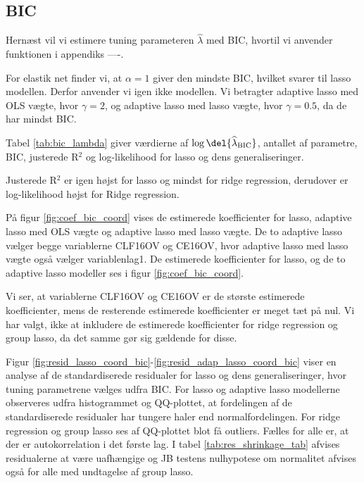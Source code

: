 \subsection{BIC}
Hernæst vil vi estimere tuning parameteren \(\widehat{\lambda}\) med BIC, hvortil vi anvender funktionen i appendiks ----.

For elastik net finder vi, at $\alpha = 1$ giver den mindste BIC, hvilket svarer til lasso modellen. Derfor anvender vi igen ikke modellen. 
Vi betragter adaptive lasso med OLS vægte, hvor $\gamma = 2$, og adaptive lasso med lasso vægte, hvor $\gamma = 0.5$, da de har mindst BIC. 

Tabel \ref{tab:bic_lambda} giver værdierne af $\log \del{ \widehat{\lambda}_\text{BIC}}$, antallet af parametre, BIC, justerede R$^2$ og log-likelihood for lasso og dens generaliseringer. 

Justerede R$^2$ er igen højst for  lasso og mindst for ridge regression, derudover er log-likelihood højst for Ridge regression. 



På figur \ref{fig:coef_bic_coord} vises de estimerede koefficienter for lasso, adaptive lasso med OLS vægte og adaptive lasso med lasso vægte.
De to adaptive lasso vælger begge variablerne  \textcolor{blue3}{CLF16OV} og \textcolor{blue3}{CE16OV}, hvor adaptive lasso med lasso vægte også vælger variablen\textcolor{blue3}{lag1}. 
De estimerede koefficienter for lasso, og de to adaptive lasso modeller ses i figur \ref{fig:coef_bic_coord}. 

 
Vi ser, at variablerne \textcolor{blue3}{CLF16OV} og \textcolor{blue3}{CE16OV} er de største estimerede koefficienter, mens de resterende estimerede koefficienter er meget tæt på nul. 
Vi har valgt, ikke at inkludere de estimerede koefficienter for ridge regression og group lasso, da det samme gør sig gældende for disse.


Figur \ref{fig:resid_lasso_coord_bic}-\ref{fig:resid_adap_lasso_coord_bic} viser en analyse af de standardiserede residualer for lasso og dens generaliseringer, hvor tuning parametrene vælges udfra BIC.
For lasso og adaptive lasso modellerne observeres udfra histogrammet og QQ-plottet, at fordelingen af de standardiserede residualer har tungere haler end normalfordelingen.
For ridge regression og group lasso ses af QQ-plottet blot få outliers.
Fælles for alle er, at der er autokorrelation i det første lag. 
I tabel \ref{tab:res_shrinkage_tab} afvises residualerne at være uafhængige og JB testens nulhypotese om normalitet afvises også for alle med undtagelse af group lasso.


